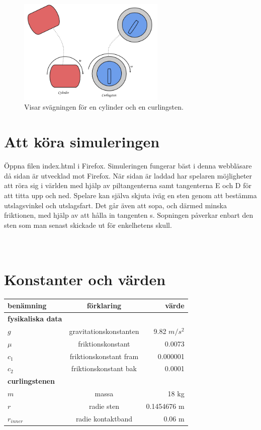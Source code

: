 \documentclass[11pt]{article} %
\begin{document}
\begin{figure}[ht!]
\centering
\includegraphics[width=70mm]{curl.png}
\caption{Visar svägningen för en cylinder och en curlingsten. }
\label{fig:curl}
\label{overflow}
\end{figure}

\section{Att köra simuleringen}
Öppna filen index.html i Firefox. Simuleringen fungerar bäst i denna webbläsare då sidan är utvecklad mot Firefox. När sidan är laddad har spelaren möjligheter att röra sig i världen med hjälp av piltangenterna samt tangenterna E och D för att titta upp och ned. Spelare kan själva skjuta iväg en sten genom att bestämma utslagsvinkel och utslagsfart. Det går även att sopa, och därmed minska friktionen, med hjälp av att hålla in tangenten s. Sopningen påverkar enbart den sten som man senast skickade ut för enkelhetens skull. 


\pagebreak
\appendix
\section{\\Konstanter och värden} \label{App:AppendixA}


\begin{tabular}{l | c | r}
benämning & förklaring & värde \\ \hline\hline
\textbf{fysikaliska data} & & \\ \hline
$g$ & gravitationskonstanten & 9.82 $m/s^2$\\
$\mu$ & friktionskonstant & 0.0073\\
$c_1$ & friktionskonstant fram & 0.000001\\
$c_2$ & friktionskonstant bak & 0.0001\\
\textbf{curlingstenen} & & \\ \hline
$m$ & massa & 18 kg\\
$r$ & radie sten & 0.1454676 m\\
$r_{inner}$ & radie kontaktband & 0.06 m\\ \hline
\end{tabular}
\end{document}
